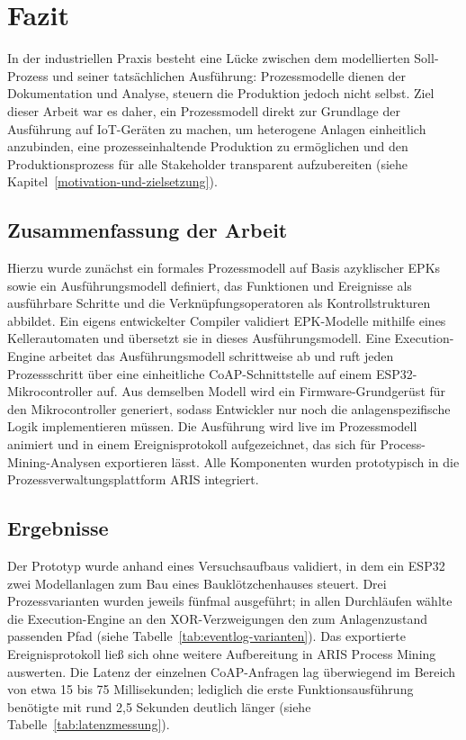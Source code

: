 \chapter{Fazit}
\label{fazit}

In der industriellen Praxis besteht eine Lücke zwischen dem modellierten Soll-Prozess und 
seiner tatsächlichen Ausführung: Prozessmodelle dienen der Dokumentation und Analyse, 
steuern die Produktion jedoch nicht selbst. Ziel dieser Arbeit war es daher, ein 
Prozessmodell direkt zur Grundlage der Ausführung auf IoT-Geräten zu machen, um 
heterogene Anlagen einheitlich anzubinden, eine prozesseinhaltende Produktion zu 
ermöglichen und den Produktionsprozess für alle Stakeholder transparent aufzubereiten 
(siehe Kapitel~\ref{motivation-und-zielsetzung}).

\section{Zusammenfassung der Arbeit}

Hierzu wurde zunächst ein formales Prozessmodell auf Basis azyklischer EPKs sowie ein 
Ausführungsmodell definiert, das Funktionen und Ereignisse als ausführbare Schritte und 
die Verknüpfungsoperatoren als Kontrollstrukturen abbildet. Ein eigens entwickelter 
Compiler validiert EPK-Modelle mithilfe eines Kellerautomaten und übersetzt sie in dieses 
Ausführungsmodell. Eine Execution-Engine arbeitet das Ausführungsmodell schrittweise ab 
und ruft jeden Prozessschritt über eine einheitliche CoAP-Schnittstelle auf einem 
ESP32-Mikrocontroller auf. Aus demselben Modell wird ein Firmware-Grundgerüst für den 
Mikrocontroller generiert, sodass Entwickler nur noch die anlagenspezifische Logik 
implementieren müssen. Die Ausführung wird live im Prozessmodell animiert und in einem 
Ereignisprotokoll aufgezeichnet, das sich für Process-Mining-Analysen exportieren lässt. 
Alle Komponenten wurden prototypisch in die Prozessverwaltungsplattform ARIS integriert.

\section{Ergebnisse}

Der Prototyp wurde anhand eines Versuchsaufbaus validiert, in dem ein ESP32 zwei 
Modellanlagen zum Bau eines Bauklötzchenhauses steuert. Drei Prozessvarianten wurden 
jeweils fünfmal ausgeführt; in allen Durchläufen wählte die Execution-Engine an den 
XOR-Verzweigungen den zum Anlagenzustand passenden Pfad 
(siehe Tabelle~\ref{tab:eventlog-varianten}). Das exportierte Ereignisprotokoll ließ sich 
ohne weitere Aufbereitung in ARIS Process Mining auswerten. Die Latenz der einzelnen 
CoAP-Anfragen lag überwiegend im Bereich von etwa 15 bis 75 Millisekunden; lediglich die 
erste Funktionsausführung benötigte mit rund 2,5 Sekunden deutlich länger 
(siehe Tabelle~\ref{tab:latenzmessung}).

